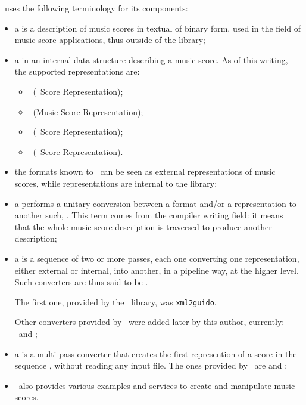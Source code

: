 \mf\ uses the following terminology for its components:
\begin{itemize}
\item a  is a description of music scores in textual of binary form, used in the field of music score applications, thus outside of the library;

\item a  in an internal data structure describing a music score. As of this writing, the supported representations are:
\begin{itemize}
\item \mxsrRepr\ (\mxml\ Score Representation);
\item \msrRepr\ (Music Score Representation);
\item \lpsrRepr\ (\lily\ Score Representation);
\item \bsrRepr\ (\braille\ Score Representation).

\end{itemize}

\item the formats known to \mf\ can be seen as external representations of music scores, while representations are internal to the library;

\item a  performs a unitary conversion between a format and/or a representation to another such, . This term comes from the compiler writing field: it means that the whole music score description is traversed to produce another description;

\item a  is a sequence of two or more passes, each one converting one representation, either external or internal, into another, in a pipeline way, at the higher level. \\
Such converters are thus said to be .

The first one, provided by the \libmusicxml\ library, was {\tt xml2guido}.

Other converters provided by \mf\ were added later by this author, currently: \xmlToLy\, \xmlToBrl\, \xmlToXml\ and \xmlToGuido;

\item a  is a multi-pass converter that creates the first represention of a score in the sequence , without reading any input file. The ones provided by \mf\ are  and ;

\item \mf\ also provides various examples and services to create and manipulate music scores.%
\end{itemize}


